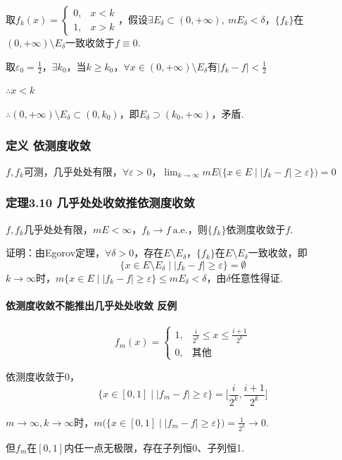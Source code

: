 \documentclass{article}
\begin{document}
	取$f_k(x)=
	\begin{cases}
		0,& x<k\\
		1,& x>k
	\end{cases}$，假设$\exists E_\delta\subset(0,+\infty),\ mE_\delta<\delta$，$\{f_k\}$在$(0,+\infty)\setminus E_\delta$一致收敛于$f\equiv0$.
	
	取$\varepsilon_0=\frac12$，$\exists k_0$，当$k\ge k_0$，$\forall x\in(0,+\infty)\setminus E_\delta$有$|f_k-f|<\frac12$
	
	$\therefore x<k$
	
	$\therefore (0,+\infty)\setminus E_\delta\subset(0,k_0)$，即$E_\delta\supset(k_0,+\infty)$，矛盾.
	
	\subsubsection{定义 依测度收敛}
	$f,f_k$可测，几乎处处有限，$\forall \varepsilon>0$，$\displaystyle 
	\lim_{k\to\infty}mE\big(\{x\in E\mid |f_k-f|\ge\varepsilon\}\big)=0
	$
	
	\subsubsection{定理3.10 几乎处处收敛推依测度收敛}
	$f,f_k$几乎处处有限，$mE<\infty$，$f_k\to f\ \text{a.e.}$，则$\{f_k\}$依测度收敛于$f$.
	
	证明：由Egorov定理，$\forall \delta>0$，存在$E\setminus E_\delta$，$\{f_k\}$在$E\setminus E_\delta$一致收敛，即
	\[
	\{x\in E\setminus E_\delta\mid |f_k-f|\ge\varepsilon\}=\emptyset
	\]
	$k\to\infty$时，$m\{x\in E\mid |f_k-f|\ge\varepsilon\}\le mE_\delta<\delta$，由$\delta$任意性得证.
	
	\paragraph{依测度收敛不能推出几乎处处收敛 反例}
	\[
	f_m(x)=
	\begin{cases}
		1,& \frac{i}{2^k}\le x\le\frac{i+1}{2^k}\\
		0,& \text{其他}
	\end{cases}
	\]
	
	依测度收敛于$0$，
	\[
	\Big\{x\in[0,1]\mid |f_m-f|\ge\varepsilon\Big\}=\Big[\frac{i}{2^k},\frac{i+1}{2^k}\Big]
	\]
	
	$m\to\infty,k\to\infty$时，$m\Big(\big\{x\in[0,1]\mid |f_m-f|\ge\varepsilon\big\}\Big)=\frac1{2^k}\to0$.
	
	但$f_m$在$[0,1]$内任一点无极限，存在子列恒0、子列恒1.
	
\end{document}

